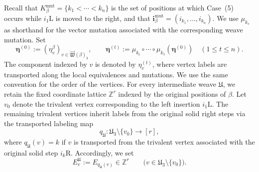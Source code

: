 \documentclass[12pt, reqno]{amsart}
\theoremstyle{plain}
\theoremstyle{definition}
\numberwithin{equation}{section}
\newcommand{\ZZ}{\mathbb{Z}}
\begin{document}
Recall that
\(K_\beta^{\mathrm{mut}}=\{k_1<\cdots<k_n\}\) is the set of positions at which
Case~\textup{(5)} occurs while \(i_1\mathrm L\) is moved to the
right, and that
\(\mathbf i_\beta^{\mathrm{mut}}=(i_{k_1},\ldots,i_{k_n})\). We use
\(\mu_{k_s}\) as shorthand for the vector mutation associated with
the corresponding weave mutation. Set
\begin{equation}\label{eq:successive-eta-tuples}
    \boldsymbol\eta^{(0)}
    :=(\eta_v^\beta)_
       {v\in\overrightarrow{\mathfrak W}(\beta)_3},
    \qquad
    \boldsymbol\eta^{(t)}
    :=\mu_{k_t}\circ\cdots\circ\mu_{k_1}
      (\boldsymbol\eta^{(0)})
      \quad(1\leq t\leq n).
\end{equation}
The component indexed by \(v\) is denoted by \(\eta_v^{(t)}\),
where vertex labels are transported along the local equivalences and
mutations. We use the same convention for the order of the vertices.
For every intermediate weave \(\mathfrak U\), we retain the fixed
coordinate lattice \(\ZZ^r\) indexed by the original positions of
\(\beta\). Let \(v_0\) denote the trivalent vertex corresponding to
the left insertion \(i_1\mathrm L\). The remaining trivalent vertices
inherit labels from the original solid right steps via the transported
labeling map
\begin{equation}\label{eq:transported-vertex-position-map}
    q_{\mathfrak U}\colon
    \mathfrak U_3\setminus\{v_0\}
    \longrightarrow [r],
\end{equation}
where \(q_{\mathfrak U}(v)=k\) if \(v\) is transported from the
trivalent vertex associated with the original solid step
\(i_k\mathrm R\). Accordingly, we set
\begin{equation}\label{eq:transported-coordinate-vector}
    E_v^{\mathfrak U}
    :=
    E_{q_{\mathfrak U}(v)}
    \in\ZZ^r
    \qquad
    \bigl(v\in\mathfrak U_3\setminus\{v_0\}\bigr).
\end{equation}
\end{document}
